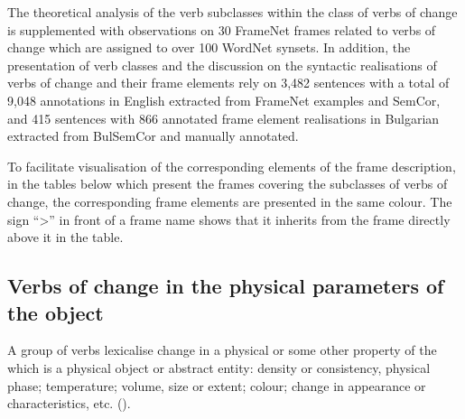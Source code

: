 \documentclass[output=paper,colorlinks,citecolor=brown]{langscibook}
\begin{document}
The theoretical analysis of the verb subclasses within the class of verbs of change is supplemented with observations on 30 FrameNet frames related to verbs of change which are assigned to over 100 WordNet synsets. In addition, the presentation of verb classes and the discussion on the syntactic realisations of verbs of change and their frame elements 
rely on 3,482 sentences with a total of 9,048 annotations in English extracted from FrameNet examples and SemCor, and 415 sentences with 866 annotated frame element realisations in Bulgarian extracted from BulSemCor and manually annotated.

To facilitate visualisation of the corresponding elements of the frame description, in the tables below which present the frames covering the subclasses of verbs of change, the corresponding frame elements are presented in the same colour. The sign “>” in front of a frame name shows that it inherits from the frame directly above it in the table.

\subsection{Verbs of change in the physical parameters of the object}\label{sec:physicalchangescale}

A group of verbs lexicalise change in a physical or some other property of the  which is a physical object or abstract entity: density or consistency, physical phase; temperature; volume, size or extent; colour; change in appearance or characteristics, etc. ().
\end{document}
